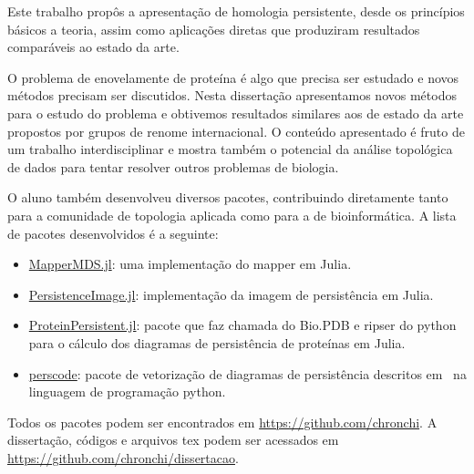 Este trabalho propôs a apresentação de homologia persistente, desde os princípios
básicos a teoria, assim como aplicações diretas que produziram resultados 
comparáveis ao estado da arte.

O problema de enovelamente de proteína é algo que precisa ser estudado e novos
métodos precisam ser discutidos. Nesta dissertação apresentamos novos métodos
para o estudo do problema e obtivemos resultados similares aos de estado
da arte propostos por grupos de renome internacional. O conteúdo
apresentado é fruto de um trabalho interdisciplinar e mostra também
o potencial da análise topológica de dados para tentar resolver outros
problemas de biologia. 

O aluno também desenvolveu diversos pacotes, contribuindo diretamente tanto
para a comunidade de topologia aplicada como para a de bioinformática.
A lista de pacotes desenvolvidos é a seguinte:
\begin{itemize}
    \item \href{https://github.com/chronchi/MapperMDS.jl}{MapperMDS.jl}: 
        uma implementação do mapper em Julia.
    \item \href{https://github.com/chronchi/PersistenceImage.jl}{PersistenceImage.jl}:
        implementação da imagem de persistência em Julia. 
    \item \href{https://github.com/chronchi/ProteinPersistent.jl}{ProteinPersistent.jl}:
        pacote que faz chamada do Bio.PDB e ripser do python para o cálculo dos diagramas
        de persistência de proteínas em Julia. 
    \item \href{https://github.com/chronchi/perscode}{perscode}: pacote de vetorização
        de diagramas de persistência descritos em~\cite{zielinski2018} na linguagem
        de programação python.
\end{itemize}

Todos os pacotes podem ser encontrados em \url{https://github.com/chronchi}. A dissertação,
códigos e arquivos tex podem ser acessados em \url{https://github.com/chronchi/dissertacao}.
